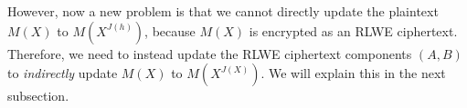 \begin{comment}
$ $

$ =  \bm{(}\text{ } M( \omega^{5^h} ), \text{ } M( \omega^{5^{1+h}}), \text{ } M( \omega^{5^{2+h}}), \cdots, \text{ } M( \omega^{5^{\frac{n}{2}-1+h}}), \text{ } M(\overline{\omega}^{5^{\frac{n}{2}-1+h}} ),  \cdots, M( \overline\omega^{5^{1+h}} ), \text{ } M( \overline\omega^{5^{h}} ) \text{ }\bm{)} $

$ $

$ =  \bm{(}\text{ } M( \omega^{5^h} ), \text{ } M( \omega^{5^{1+h}}), \text{ } M( \omega^{5^{2+h}}), \cdots, \text{ } M( \omega^{5^{h-1}}), \text{ } M(\overline{\omega}^{5^{h-1}} ),  \cdots, M( \overline\omega^{5^{1+h}} ), \text{ } M( \overline\omega^{5^{h}} ) \text{ }\bm{)} $ 

\textcolor{red}{\# since $5^{\frac{n}{2}} \bmod 2n = 1$}

$ $

Since the above vector is a Hermitian vector, we will remove its second half (i.e., conjugates of the first half) to retrieve the original input vector, which gives us the following:


$ \bm{(}\text{ } M( \omega^{5^h} ), \text{ } M( \omega^{5^{1+h}}), \text{ } M( \omega^{5^{2+h}}), \cdots, \text{ } M( \omega^{5^{\frac{n}{2}-2}}) \text{ } M( \omega^{5^{\frac{n}{2}-1}}), \text{ } M( \omega^{5^{0}}), \text{ } M( \omega^{5^{1}}), \cdots, M( \omega^{5^{h-1}}) \text{ }\bm{)} $

$ $

$ = \bm{(}\text{ } M(\omega^{J(h)}), \text{ } M(\omega^{J(h+1)}), \cdots, \text{ } M(\omega^{J(\frac{n}{2}-2)}), \text{ } M(\omega^{J(\frac{n}{2}-1)}), \text{ } M(\omega^{J(0)}), \text{ } M(\omega^{J(1)}), \cdots, \text{ } M(\omega^{J(h-1)})  \text{ }\bm{)}$

$ $

$= \vec{v}^{\langle h \rangle}$

$ $

In conclusion, given the modified encoding matrix $\hathat{W}$ and modified decoding matrix $\hathat{W}^*$, rotating all elements of the input vector $\vec{v}$ by $h$ positions to the left is equivalent to updating the plaintext polynomial $M(X)$ to $M(X^{J(h)})$. 
\end{comment}


However, now a new problem is that we cannot directly update the plaintext $M(X)$ to $M(X^{J(h)})$, because $M(X)$ is encrypted as an RLWE ciphertext. Therefore, we need to instead update the RLWE ciphertext components $(A, B)$ to \textit{indirectly} update $M(X)$ to $M(X^{J(X)})$. We will explain this in the next subsection. 


